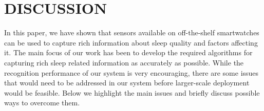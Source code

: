 \section{DISCUSSION}\label{sec:discussion}

In this paper, we have shown that sensors available on off-the-shelf smartwatches can be used to capture rich information about sleep quality and factors affecting it. The main focus of our work has been to develop the required algorithms for capturing rich sleep related information as accurately as possible. While the recognition performance of our system is very encouraging, there are some issues that would need to be addressed in our system before larger-scale deployment would be feasible. Below we highlight the main issues and briefly discuss possible ways to overcome them.



